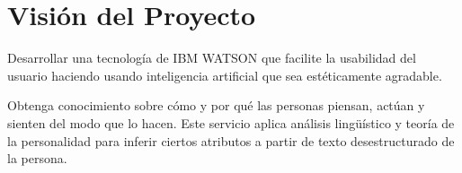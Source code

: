 \chapter{Visión del Proyecto}
Desarrollar una tecnología de IBM WATSON que facilite la usabilidad del usuario haciendo usando inteligencia artificial que sea estéticamente agradable.

Obtenga conocimiento sobre cómo y por qué las personas piensan, actúan y sienten del modo que lo hacen. Este servicio aplica análisis lingüístico y teoría de la personalidad para inferir ciertos atributos a partir de texto desestructurado de la persona.